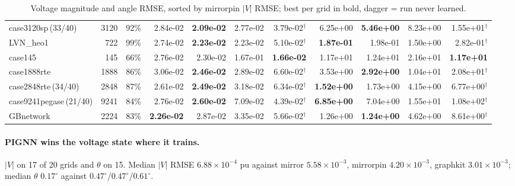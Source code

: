 \documentclass[10pt]{article}
\begin{document}
\begin{landscape}
\begin{table}[H]
\begin{tabular}{lrr rrrr rrrr}
case3120sp\,(33/40) & 3120 & 92\% & 2.84e-02 & \textbf{2.09e-02} & 2.77e-02 & 3.79e-02$^\dagger$ & 6.25e+00 & \textbf{5.46e+00} & 8.23e+00 & 1.55e+01$^\dagger$ \\
LVN\_heo1 & 722 & 99\% & 2.74e-02 & \textbf{2.23e-02} & 2.23e-02 & 5.10e-02$^\dagger$ & \textbf{1.87e-01} & 1.98e-01 & 1.50e+00 & 2.82e-01$^\dagger$ \\
case145 & 145 & 66\% & 2.76e-02 & 2.30e-02 & 1.67e-01 & \textbf{1.66e-02} & 1.17e+01 & 1.24e+01 & 2.16e+01 & \textbf{1.17e+01} \\
case1888rte & 1888 & 86\% & 3.06e-02 & \textbf{2.46e-02} & 2.89e-02 & 6.60e-02$^\dagger$ & 3.53e+00 & \textbf{2.92e+00} & 1.04e+01 & 2.08e+01$^\dagger$ \\
case2848rte\,(34/40) & 2848 & 87\% & 2.61e-02 & \textbf{2.49e-02} & 3.18e-02 & 6.34e-02$^\dagger$ & \textbf{1.52e+00} & 1.73e+00 & 4.15e+00 & 6.77e+00$^\dagger$ \\
case9241pegase\,(21/40) & 9241 & 84\% & 2.76e-02 & \textbf{2.60e-02} & 7.09e-02 & 4.39e-02$^\dagger$ & \textbf{6.85e+00} & 7.04e+00 & 1.55e+01 & 1.08e+02$^\dagger$ \\
GBnetwork & 2224 & 83\% & \textbf{2.26e-02} & 2.87e-02 & 3.35e-02 & 5.66e-02$^\dagger$ & 1.26e+00 & \textbf{1.24e+00} & 4.62e+00 & 8.61e+00$^\dagger$ \\
\bottomrule
\end{tabular}
\caption{Voltage magnitude and angle RMSE, sorted by mirrorpin $|V|$ RMSE; best per grid in bold, dagger = run never learned.}
\end{table}
\end{landscape}

\paragraph{PIGNN wins the voltage state where it trains.} $|V|$ on 17 of 20
grids and $\theta$ on 15. Median $|V|$ RMSE $6.88\times10^{-4}$ pu against
mirror $5.58\times10^{-3}$, mirrorpin $4.20\times10^{-3}$, graphkit
$3.01\times10^{-3}$; median $\theta$ $0.17^\circ$ against
$0.47^\circ$/$0.47^\circ$/$0.61^\circ$.
\end{document}

